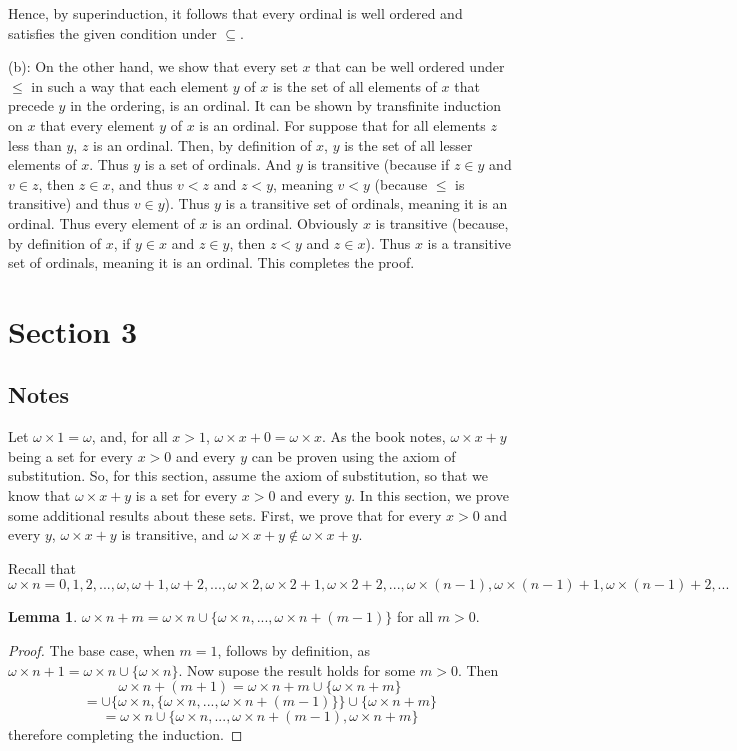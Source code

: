 \documentclass{article}
\theoremstyle{definition}
\newtheorem{lemma}[theorem]{Lemma}
\begin{document}
Hence, by superinduction, it follows that every ordinal is well ordered and satisfies the given condition under 
$\subseteq$. 

(b): On the other hand, we show that every set $x$ that can be well ordered under $\le$ in such a way that each element $y$ of $x$ 
is the set of all elements of $x$ that precede $y$ in the ordering, is an ordinal. It can be shown by transfinite induction 
on $x$ that every element $y$ of $x$ is an ordinal. For suppose that for all elements $z$ less than $y$, $z$ is an ordinal. 
Then, by definition of $x$, $y$ is the set of all lesser elements of $x$. Thus $y$ is a set of ordinals. And 
$y$ is transitive (because if $z\in y$ and $v\in z$, then $z\in x$, and thus $v<z$ and $z<y$, meaning 
$v<y$ (because $\le$ is transitive) and thus $v\in y$). Thus $y$ is a transitive set of ordinals, meaning it is an ordinal.
Thus every element of $x$ is an ordinal. Obviously $x$ is transitive (because, by definition of $x$, if 
$y\in x$ and $z\in y$, then $z<y$ and $z\in x$). Thus $x$ is a transitive set of ordinals, meaning it is an ordinal. 
This completes the proof.

\section*{Section 3}

\subsection*{Notes}
Let $\omega\times 1=\omega$, and, for all $x>1$, $\omega\times x+0=\omega\times x$. As the book notes, $\omega\times x+y$ being a set 
for every $x>0$ and every $y$ can be proven using the axiom of substitution. So, for this section, assume the axiom of substitution, so that we know that 
$\omega\times x+y$ is a set for every $x>0$ and every $y$. In this section, we prove some additional results about these sets.
First, we prove that for every 
$x>0$ and every $y$, $\omega\times x+y$ is transitive, and $\omega\times x+y\notin\omega\times x+y$. 

Recall that
\[ \omega\times n=0,1,2,...,\omega,\omega+1,\omega+2,...,\omega\times 2,\omega\times 2+1,\omega\times 2+2,...,\omega\times (n-1),\omega\times (n-1)+1,\omega\times (n-1)+2,... \]
\begin{lemma} $\omega\times n+m=\omega\times n\cup\{\omega\times n,...,\omega\times n+(m-1)\}$ for all $m>0$.
\end{lemma}
\begin{proof}
The base case, when $m=1$, follows by definition, as $\omega\times n+1=\omega\times n\cup\{\omega\times n\}$. Now supose the result 
holds for some $m>0$. Then
\[ \omega\times n+(m+1)=\omega\times n+m\cup\{\omega\times n+m\} \]
\[ =\cup\{\omega\times n,\{\omega\times n,...,\omega\times n+(m-1)\}\}\cup\{\omega\times n+m\} \]
\[ =\omega\times n\cup\{\omega\times n,...,\omega\times n+(m-1),\omega\times n+m\} \]
therefore completing the induction. 
\end{proof}
\end{document}
